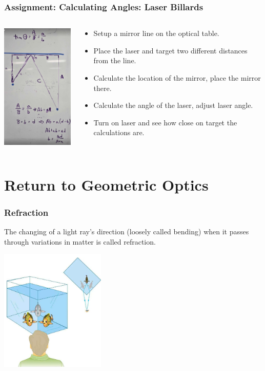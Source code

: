 \documentclass{beamer}
\begin{document}
\begin{frame}\frametitle{Assignment: Calculating Angles: Laser Billards}
\begin{columns}
\begin{column}{4cm}
\begin{center}
\includegraphics[width=4cm]{fig/billards.jpg}
\end{center}
\end{column}
\begin{column}{7cm}
\begin{itemize}
\item Setup a mirror line on the optical table.
\item Place the laser and target two different distances from the line.
\item Calculate the location of the mirror, place the mirror there.
\item Calculate the angle of the laser, adjust laser angle.
\item Turn on laser and see how close on target the calculations are.
\end{itemize}
\end{column}
\end{columns}
\end{frame}


\section{Return to Geometric Optics}

\begin{frame}\frametitle{Refraction}
The changing of a light ray’s direction (loosely called bending) when it passes through variations in matter is called refraction.

\begin{center}
\includegraphics[width=5cm]{fig/fish.png}
\end{center}

\end{frame}
\end{document}
